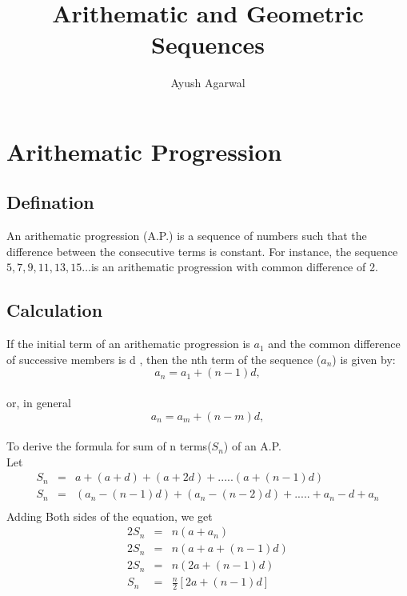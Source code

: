 \documentclass[a4paper,10pt]{article}
\title{Arithematic and Geometric Sequences}
\author{Ayush Agarwal}
\date{}
\begin{document}
\maketitle


\section{Arithematic Progression}
\subsection*{Defination}
An arithematic progression (A.P.) is a sequence of numbers such that the difference between the consecutive terms is constant. 
For instance, the sequence $5, 7, 9, 11, 13, 15 … $is an arithematic progression with common difference of 2.\\

\subsection*{Calculation}
If the initial term of an arithematic progression is $a_1$ and the common difference of successive members is d
, then the nth term of the sequence ($a_n$) is given by:\\
\vspace{2mm}
 $$a_n = a_1 + (n - 1)d,$$\\
 or, in general
 $$a_n = a_m + (n - m)d,$$\\
To derive the formula for sum of n terms($S_n$) of an A.P.\\
Let \\
\begin{eqnarray*}
S_n&=& a + (a + d) + (a + 2d) + ..... (a + (n - 1)d)\\
S_n&=&(a_n - (n - 1)d) + (a_n - (n - 2)d) + ..... + a_n - d + a_n\\
\end{eqnarray*}
\textrm Adding Both sides of the equation, we get\\
\begin{eqnarray*}
2S_n&=& n(a + a_n)\\
2S_n&=& n(a + a + (n - 1)d) \\
2S_n&=& n(2a + (n - 1)d) \\
S_n&=& \frac{n}{2}[2a + (n - 1)d] \\
\end{eqnarray*} 
\end{document}
